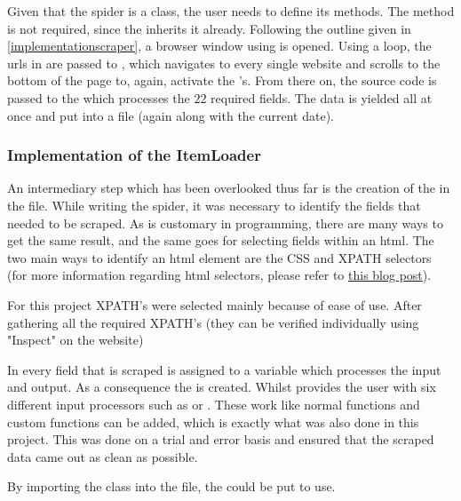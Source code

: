 \documentclass[main]{subfiles}
\begin{document}
Given that the spider is a class, the user needs to define its methods. 
The  method is not required, since the  inherits it already.
Following the outline given in \ref{implementationscraper},
a browser window using  \pkg[Selenium] is opened.
Using a \pkg[for] loop, the \acsp*{url} in  are passed to \pkg[Selenium],
which navigates to every single website and scrolls to the bottom of the page to, again, activate the \js's.
From there on, the source code is passed to the \pkg[ItemLoader] which processes the $22$ required fields.
The data is yielded all at once and put into a \pkg[.csv] file (again along with the current date).

\vspace*{5pt}
\subsubsection{Implementation of the ItemLoader}
\label{itemloader}
An intermediary step which has been overlooked thus far is the creation of the \pkg[ItemLoader] in the \pkg[items.py] file.
While writing the  spider, it was necessary to identify the fields that needed to be scraped.
As is customary in programming, there are many ways to get the same result, 
and the same goes for selecting fields within an \acs*{html}.
The two main ways to identify an \acs*{html} element are the CSS and XPATH selectors 
(for more information regarding \acs*{html} selectors, please refer to 
\href{https://medium.com/geekculture/how-to-parse-a-webpage-using-selectors-scraping-with-dfb3894cff58}{this blog post}).

For this project XPATH's were selected mainly because of ease of use.
After gathering all the required XPATH's (they can be verified individually using "Inspect" on the website)

In \pkg[items.py] every field that is scraped is assigned to a variable which processes the input and output.
As a consequence the \pkg[ItemLoader] is created.
Whilst \pkg[Scrapy] provides the user with six different input processors such as \pkg[TakeFirst()] or \pkg[MapCompose()].
These work like normal functions \cite{sDemystifyingScrapyItem2020} and custom functions can be added, 
which is exactly what was also done in this project.
This was done on a trial and error basis and ensured that the scraped data came out as clean as possible.

By importing the class \pkg[ComparisWebscraperItem] into the  file, the \pkg[ItemLoader] 
could be put to use.
\end{document}
